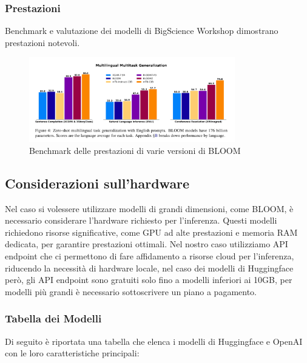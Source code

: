\documentclass{article}
\begin{document}
\subsubsection{Prestazioni}
Benchmark e valutazione dei modelli di BigScience Workshop dimostrano prestazioni notevoli.

\begin{figure}[H]
    \centering
    \includegraphics[width=0.8\textwidth]{img/performance_benchmark_bloom.png}
    \caption{Benchmark delle prestazioni di varie versioni di BLOOM}
    \label{fig:performance_benchmark_bloom}
\end{figure}

\subsection{Considerazioni sull'hardware}
Nel caso si volessere utilizzare modelli di grandi dimensioni, come BLOOM, è necessario considerare l'hardware richiesto per l'inferenza. Questi modelli richiedono risorse significative, come GPU ad alte prestazioni e memoria RAM dedicata, per garantire prestazioni ottimali.
Nel nostro caso utilizziamo API endpoint che ci permettono di fare affidamento a risorse cloud per l'inferenza, riducendo la necessità di hardware locale, nel caso dei modelli di Huggingface però, gli API endpoint sono gratuiti solo fino a modelli inferiori ai 10GB, per modelli più grandi è necessario sottoscrivere un piano a pagamento.
\subsubsection{Tabella dei Modelli}
Di seguito è riportata una tabella che elenca i modelli di Huggingface e OpenAI con le loro caratteristiche principali:
\end{document}
